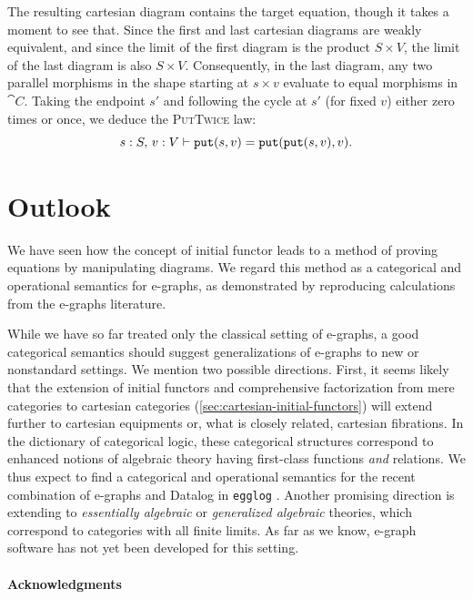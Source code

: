 \documentclass[11pt]{article}
\numberwithin{equation}{section}
\begin{document}
The resulting cartesian diagram contains the target equation, though it takes a
moment to see that. Since the first and last cartesian diagrams are weakly
equivalent, and since the limit of the first diagram is the product ${S \times V}$,
the limit of the last diagram is also ${S \times V}$. Consequently, in the last
diagram, any two parallel morphisms in the shape starting at $s \times v$
evaluate to equal morphisms in $\cat{C}$. Taking the endpoint $s'$ and following
the cycle at $s'$ (for fixed $v$) either zero times or once, we deduce the
\textsc{PutTwice} law:
\begin{equation*}
  s: S,\, v: V \vdash \mathtt{put}(s, v) = \mathtt{put}(\mathtt{put}(s, v), v).
\end{equation*}

\section{Outlook}
\label{sec:outlook}

We have seen how the concept of initial functor leads to a method of proving
equations by manipulating diagrams. We regard this method as a categorical and
operational semantics for e-graphs, as demonstrated by reproducing calculations
from the e-graphs literature.

While we have so far treated only the classical setting of e-graphs, a good
categorical semantics should suggest generalizations of e-graphs to new or
nonstandard settings. We mention two possible directions. First, it seems likely
that the extension of initial functors and comprehensive factorization from mere
categories to cartesian categories (\cref{sec:cartesian-initial-functors}) will
extend further to cartesian equipments or, what is closely related, cartesian
fibrations. In the dictionary of categorical logic, these categorical structures
correspond to enhanced notions of algebraic theory having first-class functions
\emph{and} relations. We thus expect to find a categorical and operational
semantics for the recent combination of e-graphs and Datalog in \texttt{egglog}
\cite{zhang2023}. Another promising direction is extending to \emph{essentially
  algebraic} or \emph{generalized algebraic} theories, which correspond to
categories with all finite limits. As far as we know, e-graph software has not
yet been developed for this setting.

\paragraph{Acknowledgments}
\end{document}
